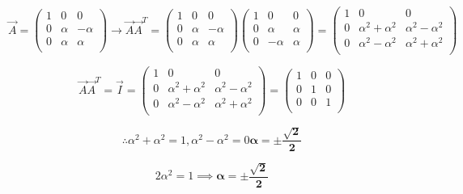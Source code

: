 \documentclass[12pt]{article}
\begin{document}
$$
\vec{A} = 
\begin{pmatrix}
    1 & 0 & 0 \\
	0 & \alpha & -\alpha\\
	0 & \alpha & \alpha \\
\end{pmatrix} \rightarrow
\vec{A}\vec{A}^T = 
\begin{pmatrix}
    1 & 0 & 0 \\
	0 & \alpha & -\alpha\\
	0 & \alpha & \alpha \\
\end{pmatrix}
\begin{pmatrix}
    1 & 0 & 0 \\
	0 & \alpha & \alpha\\
	0 & -\alpha & \alpha \\
\end{pmatrix} =
\begin{pmatrix}
    1 & 0 & 0 \\
	0 & \alpha^2 + \alpha^2 & \alpha^2 - \alpha^2\\
	0 & \alpha^2 - \alpha^2 & \alpha^2 + \alpha^2 \\
\end{pmatrix}
$$

$$
\vec{A}\vec{A}^T = \vec{I} =
\begin{pmatrix}
    1 & 0 & 0 \\
	0 & \alpha^2 + \alpha^2 & \alpha^2 - \alpha^2\\
	0 & \alpha^2 - \alpha^2 & \alpha^2 + \alpha^2 \\
\end{pmatrix} =
\begin{pmatrix}
    1 & 0 & 0 \\
	0 & 1 & 0\\
	0 & 0 & 1 \\
\end{pmatrix}
$$

$$
\therefore \alpha^2 + \alpha^2 = 1, \alpha^2 - \alpha^2 = 0 \boldsymbol{\alpha = \pm\frac{\sqrt{2}}{2}}
$$

$$
2\alpha^2 = 1 \implies \boldsymbol{\alpha = \pm\frac{\sqrt{2}}{2}}
$$
\end{document}
